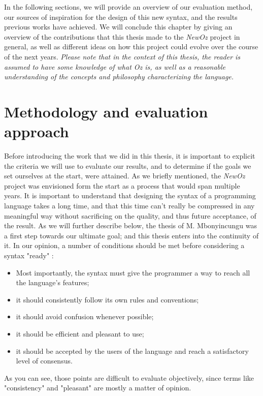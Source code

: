 In the following sections, we will provide an overview of our evaluation method, our sources of inspiration for the design of this new syntax, and the results previous works have achieved.
We will conclude this chapter by giving an overview of the contributions that this thesis made to the \textit{NewOz} project in general, as well as different ideas on how this project could evolve over the course of the next years.
\emph{Please note that in the context of this thesis, the reader is assumed to have some knowledge of what \textit{Oz} is, as well as a reasonable understanding of the concepts and philosophy characterizing the language.}

\section{Methodology and evaluation approach}\label{sec:ch1-methodology}
Before introducing the work that we did in this thesis, it is important to explicit the criteria we will use to evaluate our results, and to determine if the goals we set ourselves at the start, were attained.
As we briefly mentioned, the \textit{NewOz} project was envisioned form the start as a process that would span multiple years.
It is important to understand that designing the syntax of a programming language takes a long time, and that this time can't really be compressed in any meaningful way without sacrificing on the quality, and thus future acceptance, of the result.
As we will further describe below, the thesis of M. Mbonyincungu was a first step towards our ultimate goal;
and this thesis enters into the continuity of it.
In our opinion, a number of conditions should be met before considering a syntax "ready" :
\begin{itemize}
    \item Most importantly, the syntax must give the programmer a way to reach all the language's features;
    \item it should consistently follow its own rules and conventions;
    \item it should avoid confusion whenever possible;
    \item it should be efficient and pleasant to use;
    \item it should be accepted by the users of the language and reach a satisfactory level of consensus.
\end{itemize}
As you can see, those points are difficult to evaluate objectively, since terms like "consistency" and "pleasant" are mostly a matter of opinion.
